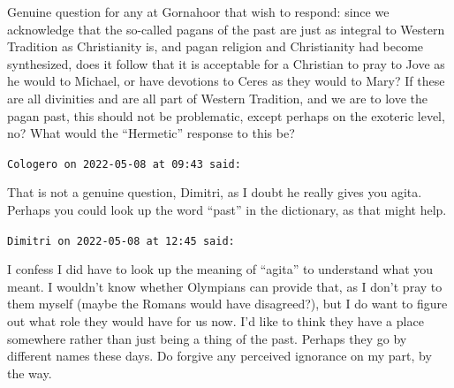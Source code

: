 \begin{footnotesize}
\begin{sffamily}
Genuine question for any at Gornahoor that wish to respond: since we acknowledge that the so-called pagans of the past are just as integral to Western Tradition as Christianity is, and pagan religion and Christianity had become synthesized, does it follow that it is acceptable for a Christian to pray to Jove as he would to Michael, or have devotions to Ceres as they would to Mary? If these are all divinities and are all part of Western Tradition, and we are to love the pagan past, this should not be problematic, except perhaps on the exoteric level, no? What would the ``Hermetic'' response to this be?

\hfill

\texttt{Cologero on 2022-05-08 at 09:43 said:}

That is not a genuine question, Dimitri, as I doubt he really gives you agita. Perhaps you could look up the word ``past'' in the dictionary, as that might help.

\hfill

\texttt{Dimitri on 2022-05-08 at 12:45 said:}

I confess I did have to look up the meaning of ``agita'' to understand what you meant. I wouldn't know whether Olympians can provide that, as I don't pray to them myself (maybe the Romans would have disagreed?), but I do want to figure out what role they would have for us now. I'd like to think they have a place somewhere rather than just being a thing of the past. Perhaps they go by different names these days. Do forgive any perceived ignorance on my part, by the way.

\end{sffamily}
\end{footnotesize}

